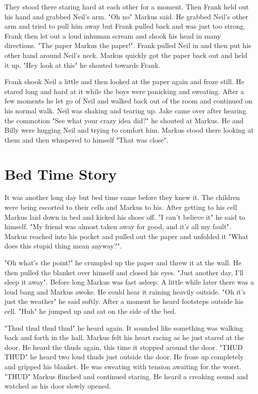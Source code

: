 \documentclass[12pt]{book}
\begin{document}
They stood there staring hard at each other for a moment. Then Frank held out his hand and grabbed Neil's arm. "Oh no" Markus said. He grabbed Neil's other arm and tried to pull him away but Frank pulled back and was just too strong. Frank then let out a loud inhuman scream and shook his head in many directions. "The paper Markus the paper!". Frank pulled Neil in and then put his other hand around Neil's neck. Markus quickly got the paper back out and held it up. "Hey look at this" he shouted towards Frank.

Frank shook Neil a little and then looked at the paper again and froze still. He stared long and hard at it while the boys were panicking and sweating. After a few moments he let go of Neil and walked back out of the room and continued on his normal walk. Neil was shaking and tearing up. Jake came over after hearing the commotion "See what your crazy idea did?" he shouted at Markus. He and Billy were hugging Neil and trying to comfort him. Markus stood there looking at them and then whispered to himself "That was close".

\chapter{Bed Time Story}

It was another long day but bed time came before they knew it. The children were being escorted to their cells and Markus to his. After getting to his cell Markus laid down in bed and kicked his shoes off. "I can't believe it" he said to himself. "My friend was almost taken away for good, and it's all my fault". Markus reached into his pocket and pulled out the paper and unfolded it "What does this stupid thing mean anyway?".

"Oh what's the point!" he crumpled up the paper and threw it at the wall. He then pulled the blanket over himself and closed his eyes. "Just another day, I'll sleep it away". Before long Markus was fast asleep. A little while later there was a loud bang and Markus awoke. He could hear it raining heavily outside. "Oh it's just the weather" he said softly. After a moment he heard footsteps outside his cell. "Huh" he jumped up and sat on the side of the bed.

"Thud thud thud thud" he heard again. It sounded like something was walking back and forth in the hall. Markus felt his heart racing as he just stared at the door. He heard the thuds again, this time it stopped around the door. "THUD THUD" he heard two loud thuds just outside the door. He froze up completely and gripped his blanket. He was sweating with tension awaiting for the worst. "THUD" Markus flinched and continued staring. He heard a creaking sound and watched as his door slowly opened.
\end{document}
